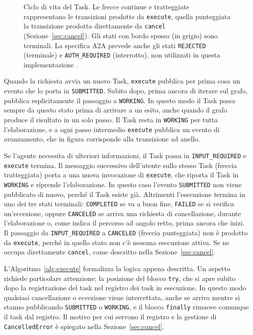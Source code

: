 \begin{figure}[htbp]
{%
    }
    \caption{Ciclo di vita del Task. Le frecce continue e tratteggiate rappresentano le transizioni prodotte da \texttt{execute}, quella punteggiata la transizione prodotta direttamente da \texttt{cancel} (Sezione~\ref{sec:cancel}). Gli stati con bordo spesso (in grigio) sono terminali. La specifica A2A prevede anche gli stati \texttt{REJECTED} (terminale) e \texttt{AUTH\_REQUIRED} (interrotto), non utilizzati in questa implementazione \cite{a2aspec}.}
\label{fig:task-lifecycle}
\end{figure}

Quando la richiesta avvia un nuovo Task, \texttt{execute} pubblica per prima cosa un evento che lo porta in \texttt{SUBMITTED}. Subito dopo, prima ancora di iterare sul grafo, pubblica esplicitamente il passaggio a \texttt{WORKING}. In questo modo il Task passa sempre da questo stato prima di arrivare a un esito, anche quando il grafo produce il risultato in un solo passo. Il Task resta in \texttt{WORKING} per tutta l'elaborazione, e a ogni passo intermedio \texttt{execute} pubblica un evento di avanzamento, che in figura corrisponde alla transizione ad anello.

Se l'agente necessita di ulteriori informazioni, il Task passa in \texttt{INPUT\_REQUIRED} e \texttt{execute} termina. Il messaggio successivo dell'utente sullo stesso Task (freccia tratteggiata) porta a una nuova invocazione di \texttt{execute}, che riporta il Task in \texttt{WORKING} e riprende l'elaborazione. In questo caso l'evento \texttt{SUBMITTED} non viene pubblicato di nuovo, perché il Task esiste già. Altrimenti l'esecuzione termina in uno dei tre stati terminali: \texttt{COMPLETED} se va a buon fine, \texttt{FAILED} se si verifica un'eccezione, oppure \texttt{CANCELED} se arriva una richiesta di cancellazione, durante l'elaborazione o, come indica il percorso ad angolo retto, prima ancora che inizi. Il passaggio da \texttt{INPUT\_REQUIRED} a \texttt{CANCELED} (freccia punteggiata) non è prodotto da \texttt{execute}, perché in quello stato non c'è nessuna esecuzione attiva. Se ne occupa direttamente \texttt{cancel}, come descritto nella Sezione~\ref{sec:cancel}.

L'Algoritmo~\ref{alg:execute} formalizza la logica appena descritta. Un aspetto richiede particolare attenzione: la posizione del blocco \texttt{try}, che si apre subito dopo la registrazione del task nel registro dei task in esecuzione. In questo modo qualsiasi cancellazione o eccezione viene intercettata, anche se arriva mentre si stanno pubblicando \texttt{SUBMITTED} o \texttt{WORKING}, e il blocco \texttt{finally} rimuove comunque il task dal registro. Il motivo per cui servono il registro e la gestione di \texttt{CancelledError} è spiegato nella Sezione~\ref{sec:cancel}.

